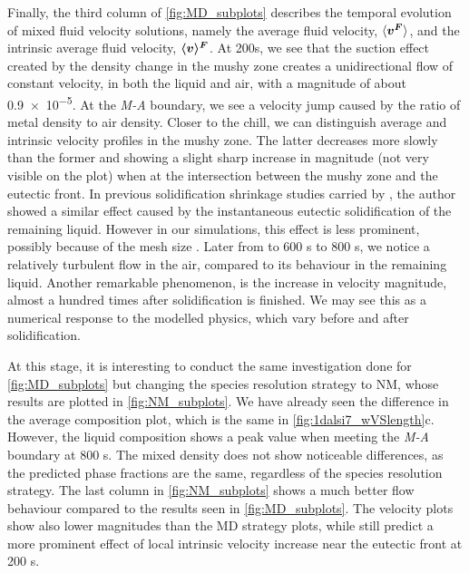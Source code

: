 Finally, the third column of \cref{fig:MD_subplots} describes the temporal evolution of mixed fluid velocity solutions, namely the average fluid velocity, $\langle \boldsymbol{v^F} \rangle$,
and the intrinsic average fluid velocity, $\boldsymbol{\langle v \rangle^F}$. At 200s, we see that the suction effect created by the density change in the mushy zone creates a
unidirectional flow of constant velocity, in both the liquid and air, with a magnitude of about \SI{0.9e-5}{\uvelocity}. At the \emph{M-A} boundary, we see a velocity
jump caused by the ratio of metal density to air density. Closer to the chill, we can distinguish average and intrinsic velocity profiles in the mushy zone. The latter decreases
more slowly than the former and showing a slight sharp increase in magnitude (not very visible on the plot) when at the intersection between the mushy zone and the eutectic front.
In previous solidification shrinkage studies carried by \citet{niane_etude_2004}, the author showed a similar effect caused by the instantaneous eutectic solidification of the remaining
liquid. However in our simulations, this effect is less prominent, possibly because of the mesh size 	. 
Later from to 600 s to 800 s, we notice a relatively turbulent flow in the air, compared to its behaviour in the remaining liquid. Another remarkable phenomenon, is the 
increase in velocity magnitude, almost a hundred times after solidification is finished. We may see this as a numerical response to the modelled physics, which vary
before and after solidification.  

At this stage, it is interesting to conduct the same investigation done for \cref{fig:MD_subplots} 
but changing the species resolution strategy to NM, whose results are plotted
in \cref{fig:NM_subplots}. We have already seen the difference in the average composition plot, which is the same in \cref{fig:1dalsi7_wVSlength}c.	However, the liquid composition shows a peak value when meeting the \emph{M-A} boundary at 800 s. 
The mixed density does not show noticeable differences, as the predicted phase fractions are the same, regardless of the species resolution strategy. 
The last column in \cref{fig:NM_subplots} shows a much better flow behaviour compared to the results seen in \cref{fig:MD_subplots}.
The velocity plots show also lower magnitudes than the MD strategy plots, while still predict a more prominent effect of 
local intrinsic velocity increase near the eutectic front at 200 s.


